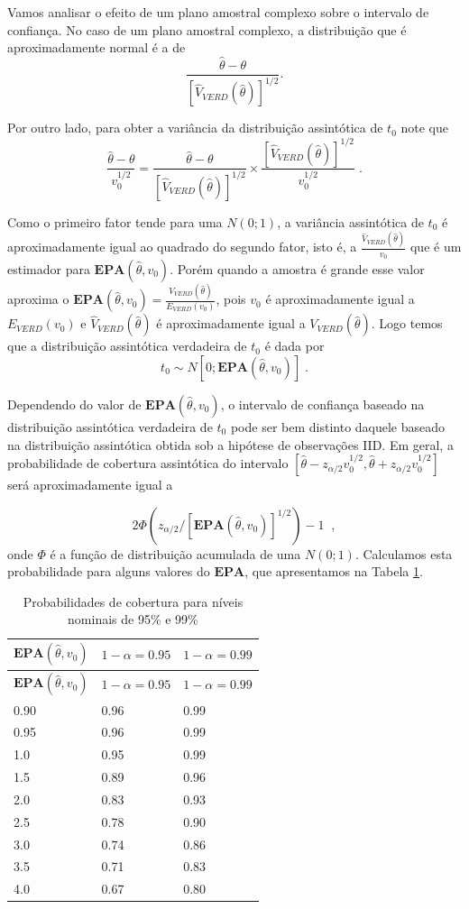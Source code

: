 \documentclass[]{book}
\theoremstyle{definition}
\theoremstyle{definition}
\theoremstyle{definition}
\theoremstyle{remark}
\begin{document}
Vamos analisar o efeito de um plano amostral complexo sobre o intervalo
de confiança. No caso de um plano amostral complexo, a distribuição que
é aproximadamente normal é a de \[
\frac{\hat{\theta}-\theta }{\left[ \widehat{V}_{VERD}\left( \hat{\theta}\right) \right] ^{1/2}}. 
\]

Por outro lado, para obter a variância da distribuição assintótica de
\(t_{0}\) note que \[
\frac{\hat{\theta}-\theta }{v_{0}^{1/2}}=\frac{\hat{\theta}-\theta }{\left[ 
\widehat{V}_{VERD}\left( \hat{\theta}\right) \right] ^{1/2}}\times \frac{
\left[ \widehat{V}_{VERD}\left( \hat{\theta}\right) \right] ^{1/2}}{
v_{0}^{1/2}}\;. 
\]

Como o primeiro fator tende para uma \(N\left( 0;1\right)\), a variância
assintótica de \(t_{0}\) é aproximadamente igual ao quadrado do segundo
fator, isto é, a
\(\frac{\widehat{V}_{VERD}\left( \hat{\theta}\right) }{v_{0}}\) que é um
estimador para \(\mathbf{EPA}\left( \hat{\theta},v_{0}\right)\). Porém
quando a amostra é grande esse valor aproxima o
\(\mathbf{EPA}\left( \hat{\theta},v_{0}\right) =\frac{V_{VERD}\left( \hat{\theta}\right) }{E_{VERD}\left( v_{0}\right) }\),
pois \(v_{0}\) é aproximadamente igual a \(E_{VERD}\left( v_{0}\right)\)
e \(\widehat{V}_{VERD}\left( \hat{\theta}\right)\) é aproximadamente
igual a \(V_{VERD}\left( \hat{\theta}\right)\). Logo temos que a
distribuição assintótica verdadeira de \(t_{0}\) é dada por \[
t_{0}\sim N\left[ 0;\mathbf{EPA}\left( \hat{\theta},v_{0}\right)
\right] \;. 
\]

Dependendo do valor de \(\mathbf{EPA}\left( \hat{\theta},v_{0}\right)\),
o intervalo de confiança baseado na distribuição assintótica verdadeira
de \(t_{0}\) pode ser bem distinto daquele baseado na distribuição
assintótica obtida sob a hipótese de observações IID. Em geral, a
probabilidade de cobertura assintótica do intervalo
\(\left[\hat{\theta}-z_{\alpha /2}v_{0}^{1/2}, \hat{\theta}+z_{\alpha/2}v_{0}^{1/2}\right]\)
será aproximadamente igual a

\[
2\Phi \left( z_{\alpha /2}/\left[ \mathbf{EPA}\left( \hat{\theta}
,v_{0}\right) \right] ^{1/2}\right) -1\;\;, 
\] onde \(\Phi\) é a função de distribuição acumulada de uma
\(N\left( 0;1\right)\). Calculamos esta probabilidade para alguns
valores do \(\mathbf{EPA}\), que apresentamos na Tabela
\ref{tab:procob}.

\begin{longtable}[]{@{}lll@{}}
\caption{\label{tab:procob} Probabilidades de cobertura para níveis nominais
de 95\% e 99\%}\tabularnewline
\toprule
\(\mathbf{EPA}\left( \hat{\theta},v_{0}\right)\) & \(1-\alpha=0.95\) &
\(1-\alpha=0.99\)\tabularnewline
\midrule
\endfirsthead
\toprule
\(\mathbf{EPA}\left( \hat{\theta},v_{0}\right)\) & \(1-\alpha=0.95\) &
\(1-\alpha=0.99\)\tabularnewline
\midrule
\endhead
0.90 & 0.96 & 0.99\tabularnewline
0.95 & 0.96 & 0.99\tabularnewline
1.0 & 0.95 & 0.99\tabularnewline
1.5 & 0.89 & 0.96\tabularnewline
2.0 & 0.83 & 0.93\tabularnewline
2.5 & 0.78 & 0.90\tabularnewline
3.0 & 0.74 & 0.86\tabularnewline
3.5 & 0.71 & 0.83\tabularnewline
4.0 & 0.67 & 0.80\tabularnewline
\bottomrule
\end{longtable}
\end{document}

